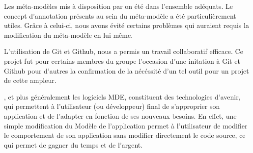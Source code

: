Les méta-modèles mis à disposition par \kwobeo{} on été dans l'ensemble adéquats. Le concept d'annotation présents au sein du méta-modèle \kwentity{} a été particulièrement utiles. Grâce à celui-ci, nous avons évité certains problèmes qui auraient requis la modification du méta-modèle en lui même.

L'utilisation de Git et Github, nous a permis un travail collaboratif efficace. Ce projet fut pour certains membres du groupe l'occasion d'une initation à Git et Github pour d'autres la confirmation de la nécéssité d'un tel outil pour un projet de cette ampleur.

\kwacceleo{}, et plus généralement les logiciels MDE, constituent des technologies d'avenir, qui permettent à l'utilisateur (ou développeur) final de s'approprier son application et de l'adapter en fonction de ses nouveaux besoins. En effet, une simple modification du Modèle de l'application permet à l'utilisateur de modifier le comportement de son application sans modifier directement le code source, ce qui permet de gagner du temps et de l'argent.



